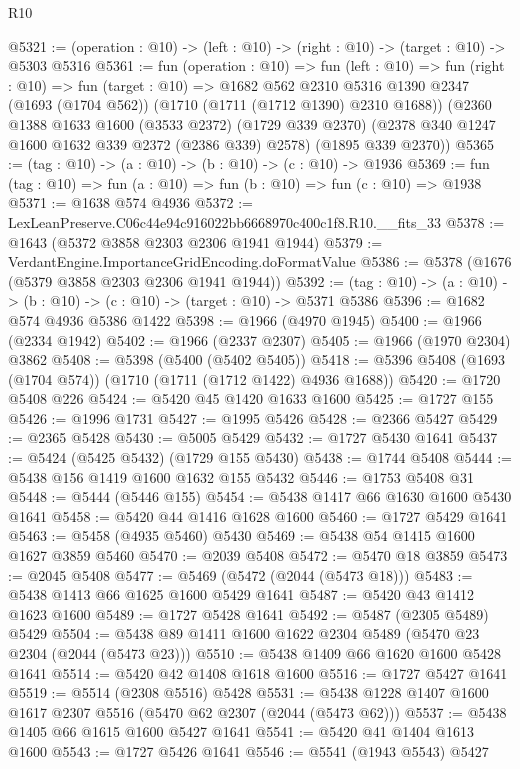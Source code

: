 \begin{lexlean}{R10}
\begin{coremodule}
@5321 := (operation : @10) -> (left : @10) -> (right : @10) -> (target : @10) -> @5303 @5316
@5361 := fun (operation : @10) =>
  fun (left : @10) =>
  fun (right : @10) =>
  fun (target : @10) =>
  @1682
    @562
    @2310
    @5316
    @1390
    @2347
    (@1693 (@1704 @562))
    (@1710 (@1711 (@1712 @1390) @2310 @1688))
    (@2360
      @1388
      @1633
      @1600
      (@3533 @2372)
      (@1729 @339 @2370)
      (@2378 @340 @1247 @1600 @1632 @339 @2372 (@2386 @339) @2578)
      (@1895 @339 @2370))
@5365 := (tag : @10) -> (a : @10) -> (b : @10) -> (c : @10) -> @1936
@5369 := fun (tag : @10) => fun (a : @10) => fun (b : @10) => fun (c : @10) => @1938
@5371 := @1638 @574 @4936
@5372 := LexLeanPreserve.C06c44e94c916022bb6668970c400c1f8.R10.__fits_33
@5378 := @1643 (@5372 @3858 @2303 @2306 @1941 @1944)
@5379 := VerdantEngine.ImportanceGridEncoding.doFormatValue
@5386 := @5378 (@1676 (@5379 @3858 @2303 @2306 @1941 @1944))
@5392 := (tag : @10) -> (a : @10) -> (b : @10) -> (c : @10) -> (target : @10) -> @5371 @5386
@5396 := @1682 @574 @4936 @5386 @1422
@5398 := @1966 (@4970 @1945)
@5400 := @1966 (@2334 @1942)
@5402 := @1966 (@2337 @2307)
@5405 := @1966 (@1970 @2304) @3862
@5408 := @5398 (@5400 (@5402 @5405))
@5418 := @5396 @5408 (@1693 (@1704 @574)) (@1710 (@1711 (@1712 @1422) @4936 @1688))
@5420 := @1720 @5408 @226
@5424 := @5420 @45 @1420 @1633 @1600
@5425 := @1727 @155
@5426 := @1996 @1731
@5427 := @1995 @5426
@5428 := @2366 @5427
@5429 := @2365 @5428
@5430 := @5005 @5429
@5432 := @1727 @5430 @1641
@5437 := @5424 (@5425 @5432) (@1729 @155 @5430)
@5438 := @1744 @5408
@5444 := @5438 @156 @1419 @1600 @1632 @155 @5432
@5446 := @1753 @5408 @31
@5448 := @5444 (@5446 @155)
@5454 := @5438 @1417 @66 @1630 @1600 @5430 @1641
@5458 := @5420 @44 @1416 @1628 @1600
@5460 := @1727 @5429 @1641
@5463 := @5458 (@4935 @5460) @5430
@5469 := @5438 @54 @1415 @1600 @1627 @3859 @5460
@5470 := @2039 @5408
@5472 := @5470 @18 @3859
@5473 := @2045 @5408
@5477 := @5469 (@5472 (@2044 (@5473 @18)))
@5483 := @5438 @1413 @66 @1625 @1600 @5429 @1641
@5487 := @5420 @43 @1412 @1623 @1600
@5489 := @1727 @5428 @1641
@5492 := @5487 (@2305 @5489) @5429
@5504 := @5438 @89 @1411 @1600 @1622 @2304 @5489 (@5470 @23 @2304 (@2044 (@5473 @23)))
@5510 := @5438 @1409 @66 @1620 @1600 @5428 @1641
@5514 := @5420 @42 @1408 @1618 @1600
@5516 := @1727 @5427 @1641
@5519 := @5514 (@2308 @5516) @5428
@5531 := @5438 @1228 @1407 @1600 @1617 @2307 @5516 (@5470 @62 @2307 (@2044 (@5473 @62)))
@5537 := @5438 @1405 @66 @1615 @1600 @5427 @1641
@5541 := @5420 @41 @1404 @1613 @1600
@5543 := @1727 @5426 @1641
@5546 := @5541 (@1943 @5543) @5427

\end{coremodule}
\end{lexlean}
